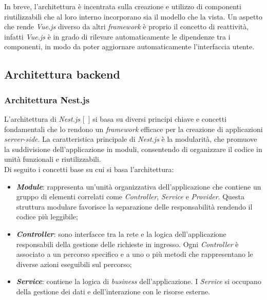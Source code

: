 In breve, l'architettura è incentrata sulla creazione e utilizzo di componenti riutilizzabili che al loro interno incorporano sia il modello che la vista. Un aspetto che rende \textit{Vue.js}
diverso da altri \textit{framework} è proprio il concetto di reattività, infatti \textit{Vue.js} è in grado di rilevare automaticamente le dipendenze tra i componenti, in modo da poter aggiornare automaticamente l'interfaccia utente.

\subsection{Architettura backend}\label{subsec:architettura-backend}
\subsubsection{Architettura Nest.js}\label{subsubsec:architettura-nest.js}
L'architettura di \textit{Nest.js} [~\cite{site:nest-architettura}] si basa su diversi principi chiave e concetti fondamentali che lo rendono un \textit{framework} efficace per la creazione di applicazioni \textit{server-side}.
La caratteristica principale di \textit{Nest.js} è la modularità, che promuove la suddivisione dell'applicazione in moduli, consentendo di organizzare il codice in unità funzionali e riutilizzabili.\\
Di seguito i concetti base su cui si basa l'architettura:
\begin{itemize}
  \item \textbf{\textit{Module}}: rappresenta un'unità organizzativa dell'applicazione che contiene un gruppo di elementi correlati come \textit{Controller}, \textit{Service} e \textit{Provider}. Questa struttura modulare 
  favorisce la separazione delle responsabilità rendendo il codice più leggibile;
  \item \textbf{\textit{Controller}}: sono interfacce tra la rete e la logica dell'applicazione responsabili della gestione delle richieste  in ingresso. Ogni \textit{Controller} è associato a un percorso specifico e a uno o più metodi che rappresentano le diverse azioni eseguibili sul percorso;
  \item \textbf{\textit{Service}}: contiene la logica di \textit{business} dell'applicazione. I \textit{Service} si occupano della gestione dei dati e dell'interazione con le risorse esterne.
\end{itemize}